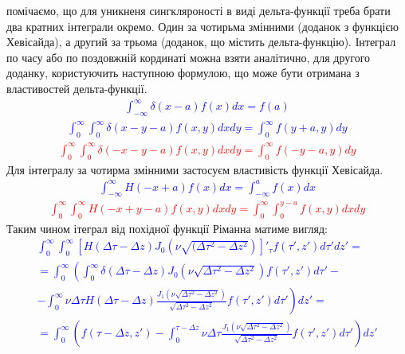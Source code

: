 помічаємо, що для уникненя сингкляроності в виді дельта-функції треба 
брати два кратних інтеграли окремо. Один за чотирьма змінними (доданок 
з функцією Хевісайда), а другий за трьома (доданок, що містить дельта-функцію).
Інтеграл по часу або по поздовжній кординаті можна взяти аналітично, для
другого доданку, користуючить наступною формулою, що може бути отримана з 
властивостей дельта-функції.
%
\textcolor{blue} { \begin{equation*} \begin{aligned}
\int_{-\infty}^{\infty} \delta(x-a) f(x) dx = f(a) 
\end{aligned} \end{equation*} }
%
\textcolor{blue} { \begin{equation*} \begin{aligned}
\int_0^\infty \int_0^\infty \delta(x-y-a) f(x,y) dx dy = 
\int_0^\infty f(y+a,y) dy
\end{aligned} \end{equation*} }
%
\textcolor{red} { \begin{equation*} \begin{aligned}
\int_0^\infty \int_0^\infty \delta(-x-y-a) f(x,y) dx dy = 
\int_0^\infty f(-y-a,y) dy
\end{aligned} \end{equation*} }
%
Для інтегралу за чотирма змінними застосуєм властивість функції Хевісайда.
%
\textcolor{blue} { \begin{equation*} \begin{aligned}
\int_{-\infty}^\infty H(-x+a) f(x) dx = 
\int_{-\infty}^{a} f(x) dx
\end{aligned} \end{equation*} }
%
\textcolor{red} { \begin{equation*} \begin{aligned}
\int_0^\infty \int_0^\infty H(-x+y-a) f(x,y) dx dy = 
\int_0^\infty \int_0^{y-a} f(x,y) dx dy
\end{aligned} \end{equation*} }
%
Таким чином ітеграл від похідної функції Ріманна матиме вигляд:
%
\textcolor{blue} { \begin{equation*} \begin{aligned}
\int_0^\infty \int_0^\infty \left[ H(\Delta \tau - \Delta z) 
J_0 \left( \nu \sqrt{(\Delta \tau^2 - \Delta z^2} \right) 
\right]'_\tau f(\tau',z') d \tau' dz' = \\
= \int_0^\infty \left( \int_0^\infty 
\delta \left( \Delta \tau - \Delta z \right)
J_0 \left( \nu \sqrt{\Delta \tau^2 - \Delta z^2} \right) 
f(\tau',z') d \tau' \right. - \\
- \left. \int_0^\infty \nu \Delta \tau H(\Delta \tau - \Delta z) 
\frac{J_1 \left( \nu \sqrt{\Delta \tau^2 - \Delta z^2} \right)}
{\sqrt{\Delta \tau^2 - \Delta z^2}} f(\tau',z') d \tau' \right) dz' = \\
= \int_0^\infty \left( f(\tau - \Delta z,z') - \int_0^{\tau - \Delta z} 
\nu \Delta \tau \frac{J_1 \left( \nu \sqrt{\Delta \tau^2 - \Delta z^2} \right)}
{\sqrt{\Delta \tau^2 - \Delta z^2}} f(\tau',z') d \tau' \right) dz'
\end{aligned} \end{equation*} }
